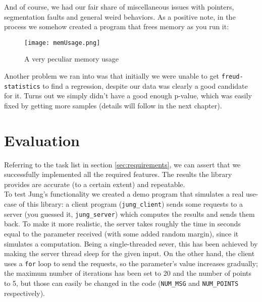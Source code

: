         And of course, we had our fair share of miscellaneous issues with pointers, segmentation faults and 
        general weird behaviors. As a positive note, in the process we somehow created a program that frees
        memory as you run it:

        \begin{figure}[H]
            \centering
            \texttt{[image: memUsage.png]}
            \caption{A very peculiar memory usage}
            \label{fig:memUsage}
        \end{figure}

        Another problem we ran into was that initially we were unable to get \texttt{freud-statistics} to find a
        regression, despite our data was clearly a good candidate for it. Turns out we simply didn't have a
        good enough p-value, which was easily fixed by getting more samples (details will follow in the next
        chapter).        


\chapter{Evaluation}


    Referring to the task list in section \ref{sec:requirements}, we can assert that we successfully implemented
    all the required features. The results the library provides are accurate (to a certain extent) and repeatable.\\

    To test Jung's functionality we created a demo program that simulates a real use-case of this library:
    a client program (\texttt{jung\_client}) sends some requests to a server (you guessed it, 
    \texttt{jung\_server}) which computes the results and sends them back. To make it more realistic,
    the server takes roughly the time in seconds equal to the parameter received (with some added
    random margin), since it simulates a computation. Being a single-threaded sever, this has been
    achieved by making the server thread sleep for the given input. On the other hand, the client
    uses a \texttt{for} loop to send the requests, so the parameter's value increases gradually;
    the maximum number of iterations has been set to 20 and the number of points to 5,
    but those can easily be changed in the code (\texttt{NUM\_MSG} and \texttt{NUM\_POINTS} respectively).\\

